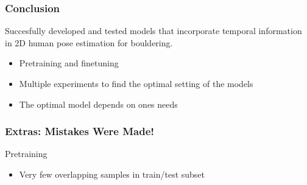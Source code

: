 \documentclass{beamer}
\begin{document}
\begin{frame}
    \frametitle{Conclusion}
    Succesfully developed and tested models that incorporate temporal information in 2D human pose estimation for bouldering.
    \begin{itemize}
        \item Pretraining and finetuning
        \item Multiple experiments to find the optimal setting of the models
        \item The optimal model depends on ones needs
    \end{itemize}
\end{frame}

\begin{frame}
    \frametitle{Extras: Mistakes Were Made!}
    Pretraining
    \begin{itemize}
        \item Very few overlapping samples in train/test subset
    \end{itemize}
\end{frame}
\end{document}
